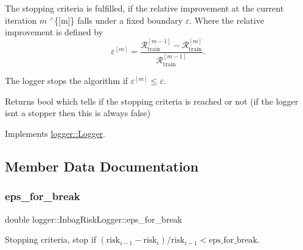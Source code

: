 The stopping criteria is fulfilled, if the relative improvement at the current iteration $m$ $^\wedge$\{\mbox{[}m\mbox{]}\} falls under a fixed boundary $\varepsilon$. Where the relative improvement is defined by \[ \varepsilon^{[m]} = \frac{\mathcal{R}_\mathrm{train}^{[m-1]} - \mathcal{R}_\mathrm{train}^{[m]}}{\mathcal{R}_\mathrm{train}^{[m-1]}}. \]

The logger stops the algorithm if $\varepsilon^{[m]} \leq \varepsilon$.

\begin{DoxyReturn}{Returns}
{\ttfamily bool} which tells if the stopping criteria is reached or not (if the logger isn\textquotesingle{}t a stopper then this is always false) 
\end{DoxyReturn}


Implements \mbox{\hyperlink{classlogger_1_1_logger_aed91421c07062b91cee158ef2bda7ae8}{logger\+::\+Logger}}.



\subsection{Member Data Documentation}
\mbox{\label{classlogger_1_1_inbag_risk_logger_a1890b49b8ffe85e1bc65b4f8ab7999fe}} 
\subsubsection{\texorpdfstring{eps\+\_\+for\+\_\+break}{eps\_for\_break}}
{\footnotesize\ttfamily double logger\+::\+Inbag\+Risk\+Logger\+::eps\+\_\+for\+\_\+break\hspace{0.3cm}{\ttfamily [private]}}



Stopping criteria, stop if $(\mathrm{risk}_{i-1} - \mathrm{risk}_i) / \mathrm{risk}_{i-1} < \mathrm{eps\_for\_break}$. 

\mbox{\label{classlogger_1_1_inbag_risk_logger_aed427deee828fd480e5fa9536360b16b}} 
